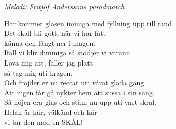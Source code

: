 {\footnotesize\textit{Melodi: Fritjof Anderssons paradmarch}}\par
\vspace{10pt}
Här kommer glasen immiga med fyllning upp till rand\\
Det skall bli gott, när vi har fått\\
känna den långt ner i magen.\\
Ifall vi blir dimmiga så stödjer vi varann.\\
Lova mig att, faller jag platt\\
så tag mig uti kragen.\\
Och fröjder er nu reccar uti vårat glada gäng.\\
Att ingen får gå nykter hem att sussa i sin säng.\\
Så höjen era glas och stäm nu upp uti vårt skrål:\\
Helan är här, välkänd och kär\\
vi tar den med en SKÅL!
